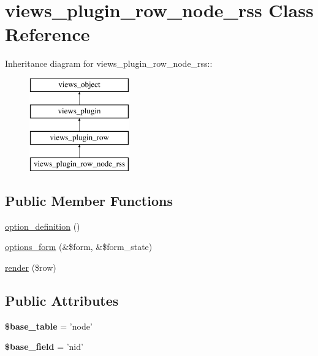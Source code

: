 \hypertarget{classviews__plugin__row__node__rss}{
\section{views\_\-plugin\_\-row\_\-node\_\-rss Class Reference}
\label{classviews__plugin__row__node__rss}
}
Inheritance diagram for views\_\-plugin\_\-row\_\-node\_\-rss::\begin{figure}[H]
\begin{center}
\leavevmode
\includegraphics[height=4cm]{classviews__plugin__row__node__rss}
\end{center}
\end{figure}
\subsection*{Public Member Functions}
\begin{CompactItemize}
\item 
\hyperlink{classviews__plugin__row__node__rss_160237bd0d2f6ee0e9c22cf7d08d8082}{option\_\-definition} ()
\item 
\hyperlink{classviews__plugin__row__node__rss_074125b7562bb918124c2dae6322f58e}{options\_\-form} (\&\$form, \&\$form\_\-state)
\item 
\hyperlink{classviews__plugin__row__node__rss_94b9baa2d0a6e196f3da863cf1784343}{render} (\$row)
\end{CompactItemize}
\subsection*{Public Attributes}
\begin{CompactItemize}
\item 
\hypertarget{classviews__plugin__row__node__rss_f8bf642a869b63e8f935f799c94983fc}{
\textbf{\$base\_\-table} = 'node'}
\label{classviews__plugin__row__node__rss_f8bf642a869b63e8f935f799c94983fc}

\item 
\hypertarget{classviews__plugin__row__node__rss_dee98801f4e3d6a5c91a56bb51e408aa}{
\textbf{\$base\_\-field} = 'nid'}
\label{classviews__plugin__row__node__rss_dee98801f4e3d6a5c91a56bb51e408aa}

\end{CompactItemize}


